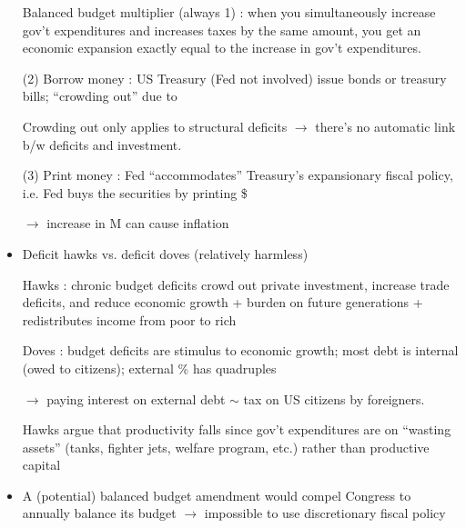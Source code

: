 \documentclass{article}
\begin{document}
\begin{itemize}
Balanced budget multiplier (always 1) : when you simultaneously increase gov't expenditures and increases taxes by the same amount, you get an economic expansion exactly equal to the increase in gov't expenditures.

(2) Borrow money : US Treasury (Fed not involved) issue bonds or treasury bills; ``crowding out'' due to 

Crowding out only applies to structural deficits $\rightarrow$ there's no automatic link b/w deficits and investment.

(3) Print money : Fed ``accommodates'' Treasury's expansionary fiscal policy, i.e. Fed buys the securities by printing \$

$\rightarrow$ increase in M can cause inflation

\item Deficit hawks vs. deficit doves (relatively harmless)

Hawks : chronic budget deficits crowd out private investment, increase trade deficits, and reduce economic growth + burden on future generations + redistributes income from poor to rich

Doves : budget deficits are stimulus to economic growth;
most debt is internal (owed to citizens); external \% has quadruples

$\rightarrow$ paying interest on external debt $\sim$ tax on US citizens by foreigners.

Hawks argue that productivity falls since gov't expenditures are on ``wasting assets'' (tanks, fighter jets, welfare program, etc.) rather than productive capital

\item A (potential) balanced budget amendment would compel Congress to annually balance its budget $\rightarrow$ impossible to use discretionary fiscal policy
\end{itemize}
\end{document}
